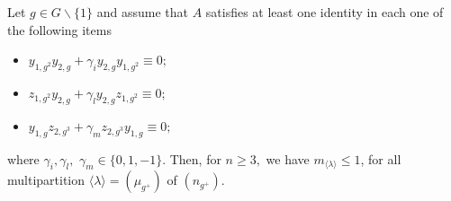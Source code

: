 \documentclass[10pt,a4paper]{amsart}
\begin{document}
\begin{lema}\label{lema2F} 
 Let $g\in G\backslash \{1\}$  and assume that $A$ satisfies at least one identity in each one of the following items
	\begin{itemize}
		\item[1)]$y_{1,g^2}y_{2,g}+\gamma_{i} y_{2,g}y_{1,g^2}\equiv 0;$
		
		\item[2)]$z_{1,g^2}y_{2,g}+\gamma_{l} y_{2,g}z_{1,g^2} \equiv 0;$
		
		\item[3)] $y_{1,g}z_{2,g^3}+\gamma_{m} z_{2,g^3}y_{1,g}\equiv 0;$
		
	\end{itemize} where $\gamma_{i}, \gamma_{l},$ $\gamma_{m} \in\{ 0,1,-1\}.$ Then, for $n\geq 3,$ we have $m_{\langle \lambda \rangle}\le 1$, for all multipartition $\langle \lambda \rangle=(\mu_{g^+})$ of  $(n_{g^+})$.
\end{lema} 
\end{document}
